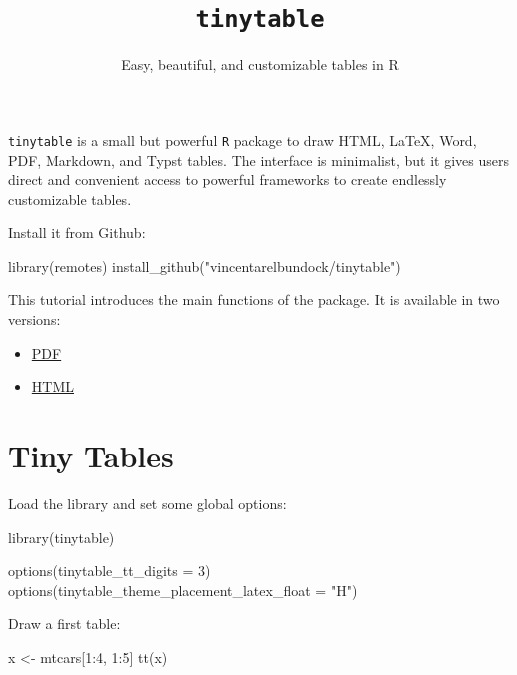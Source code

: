\documentclass[
  letterpaper,
  DIV=11,
  numbers=noendperiod]{scrartcl}
\title{\texttt{tinytable}}
\subtitle{Easy, beautiful, and customizable tables in R}
\author{}
\date{}
\newenvironment{Shaded}{\begin{snugshade}}{\end{snugshade}}
\newcommand{\AttributeTok}[1]{\textcolor[rgb]{0.40,0.45,0.13}{#1}}
\newcommand{\DecValTok}[1]{\textcolor[rgb]{0.68,0.00,0.00}{#1}}
\newcommand{\FunctionTok}[1]{\textcolor[rgb]{0.28,0.35,0.67}{#1}}
\newcommand{\NormalTok}[1]{\textcolor[rgb]{0.00,0.23,0.31}{#1}}
\newcommand{\OtherTok}[1]{\textcolor[rgb]{0.00,0.23,0.31}{#1}}
\newcommand{\SpecialCharTok}[1]{\textcolor[rgb]{0.37,0.37,0.37}{#1}}
\newcommand{\StringTok}[1]{\textcolor[rgb]{0.13,0.47,0.30}{#1}}
\providecommand{\tightlist}{%
  \setlength{\itemsep}{0pt}\setlength{\parskip}{0pt}}\usepackage{longtable,booktabs,array}
\renewcommand*\contentsname{Table of contents}
\newcommand\contentsname{Table of contents}
\begin{document}
\maketitle

\renewcommand*\contentsname{Table of contents}
{
\hypersetup{linkcolor=}
\setcounter{tocdepth}{3}
\tableofcontents
}
\clearpage

\texttt{tinytable} is a small but powerful \texttt{R} package to draw
HTML, LaTeX, Word, PDF, Markdown, and Typst tables. The interface is
minimalist, but it gives users direct and convenient access to powerful
frameworks to create endlessly customizable tables.

Install it from Github:

\begin{Shaded}
\begin{Highlighting}[]
\FunctionTok{library}\NormalTok{(remotes)}
\FunctionTok{install\_github}\NormalTok{(}\StringTok{"vincentarelbundock/tinytable"}\NormalTok{)}
\end{Highlighting}
\end{Shaded}

This tutorial introduces the main functions of the package. It is
available in two versions:

\begin{itemize}
\tightlist
\item
  \href{tutorial.pdf}{PDF}
\item
  \href{tutorial.html}{HTML}
\end{itemize}

\section{Tiny Tables}\label{tiny-tables}

Load the library and set some global options:

\begin{Shaded}
\begin{Highlighting}[]
\FunctionTok{library}\NormalTok{(tinytable)}

\FunctionTok{options}\NormalTok{(}\AttributeTok{tinytable\_tt\_digits =} \DecValTok{3}\NormalTok{)}
\FunctionTok{options}\NormalTok{(}\AttributeTok{tinytable\_theme\_placement\_latex\_float =} \StringTok{"H"}\NormalTok{)}
\end{Highlighting}
\end{Shaded}

Draw a first table:

\begin{Shaded}
\begin{Highlighting}[]
\NormalTok{x }\OtherTok{\textless{}{-}}\NormalTok{ mtcars[}\DecValTok{1}\SpecialCharTok{:}\DecValTok{4}\NormalTok{, }\DecValTok{1}\SpecialCharTok{:}\DecValTok{5}\NormalTok{]}
\FunctionTok{tt}\NormalTok{(x)}
\end{Highlighting}
\end{Shaded}
\end{document}
